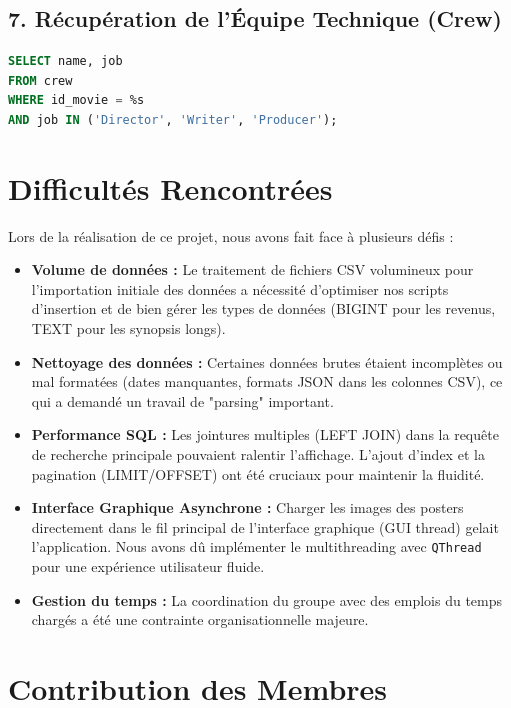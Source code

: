 \documentclass[12pt]{article}
\begin{document}
\subsection{7. Récupération de l'Équipe Technique (Crew)}
\begin{lstlisting}[language=SQL]
SELECT name, job 
FROM crew 
WHERE id_movie = %s 
AND job IN ('Director', 'Writer', 'Producer');
\end{lstlisting}

\newpage
\section{Difficultés Rencontrées}

Lors de la réalisation de ce projet, nous avons fait face à plusieurs défis :

\begin{itemize}
    \item \textbf{Volume de données :} Le traitement de fichiers CSV volumineux pour l'importation initiale des données a nécessité d'optimiser nos scripts d'insertion et de bien gérer les types de données (BIGINT pour les revenus, TEXT pour les synopsis longs).
    \item \textbf{Nettoyage des données :} Certaines données brutes étaient incomplètes ou mal formatées (dates manquantes, formats JSON dans les colonnes CSV), ce qui a demandé un travail de "parsing" important.
    \item \textbf{Performance SQL :} Les jointures multiples (LEFT JOIN) dans la requête de recherche principale pouvaient ralentir l'affichage. L'ajout d'index et la pagination (LIMIT/OFFSET) ont été cruciaux pour maintenir la fluidité.
    \item \textbf{Interface Graphique Asynchrone :} Charger les images des posters directement dans le fil principal de l'interface graphique (GUI thread) gelait l'application. Nous avons dû implémenter le multithreading avec \texttt{QThread} pour une expérience utilisateur fluide.
    \item \textbf{Gestion du temps :} La coordination du groupe avec des emplois du temps chargés a été une contrainte organisationnelle majeure.
\end{itemize}

\section{Contribution des Membres}
\end{document}
